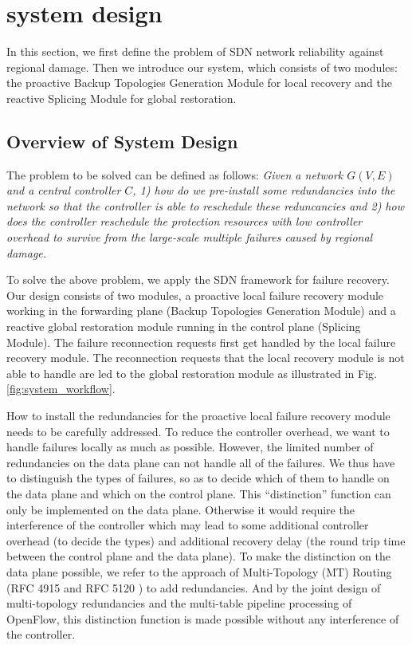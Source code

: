 \documentclass[10pt,journal]{IEEEtran}
\begin{document}
\section{system design}\label{sec:system_design}
In this section, we first define the problem of SDN network reliability against regional damage. Then we introduce our system, which consists of two modules: the proactive Backup Topologies Generation Module for local recovery and the reactive Splicing Module for global restoration.

\subsection{Overview of System Design}\label{sec:overview-of-system-design}
The problem to be solved can be defined as follows: \emph{Given a network $G(V,E)$ and a central controller $C$, 1) how do we pre-install some redundancies into the network so that the controller is able to reschedule these reduncancies and 2) how does the controller reschedule the protection resources with low controller overhead to survive from the large-scale multiple failures caused by regional damage.}

To solve the above problem, we apply the SDN framework for failure recovery. Our design consists of two modules, a proactive local failure recovery module working in the forwarding plane (Backup Topologies Generation Module) and a reactive global restoration module running in the control plane (Splicing Module). The failure reconnection requests first get handled by the local failure recovery module. The reconnection requests that the local recovery module is not able to handle are led to the global restoration module as illustrated in Fig. \ref{fig:system_workflow}.

How to install the redundancies for the proactive local failure recovery module needs to be carefully addressed. To reduce the controller overhead, we want to handle failures locally as much as possible. However,  the limited number of redundancies on the data plane can not handle all of the failures. We thus have to distinguish the types of failures, so as to decide which of them to handle on the data plane and which on the control plane. This ``distinction'' function can only be implemented on the data plane. Otherwise it would require the interference of the controller which may lead to some additional controller overhead (to decide the types) and additional recovery delay (the round trip time between the control plane and the data plane). To make the distinction on the data plane possible, we refer to the approach of Multi-Topology (MT) Routing (RFC 4915 and RFC 5120 \cite{psenak2007multi, przygienda2008m}) to add redundancies. And by the joint design of multi-topology redundancies and the multi-table pipeline processing of OpenFlow, this distinction function is made possible without any interference of the controller.
\end{document}
